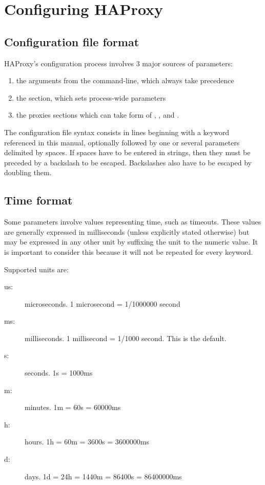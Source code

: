 \chapter{Configuring HAProxy}
\label{chap:configuring_haproxy}

\section{Configuration file format}
\label{sec:config_format}

HAProxy's configuration process involves 3 major sources of parameters:

\begin{enumerate}
\item the arguments from the command-line, which always take precedence
\item the  section, which sets process-wide parameters
\item the proxies sections which can take form of , ,
     and .
\end{enumerate}

The configuration file syntax consists in lines beginning with a keyword
referenced in this manual, optionally followed by one or several parameters
delimited by spaces. If spaces have to be entered in strings, then they must be
preceded by a backslash \chr{\bslash} to be escaped. Backslashes also have to be
escaped by doubling them.

\section{Time format}
\label{sec:time_format}

Some parameters involve values representing time, such as timeouts. These
values are generally expressed in milliseconds (unless explicitly stated
otherwise) but may be expressed in any other unit by suffixing the unit to the
numeric value. It is important to consider this because it will not be repeated
for every keyword.


Supported units are:

\begin{description}
\item[us:] microseconds. 1 microsecond = 1/1000000 second
\item[ms:] milliseconds. 1 millisecond = 1/1000 second. This is the default.
\item[s:]  seconds. 1s = 1000ms
\item[m:]  minutes. 1m = 60s = 60000ms
\item[h:]  hours.   1h = 60m = 3600s = 3600000ms
\item[d:]  days.    1d = 24h = 1440m = 86400s = 86400000ms
\end{description}

